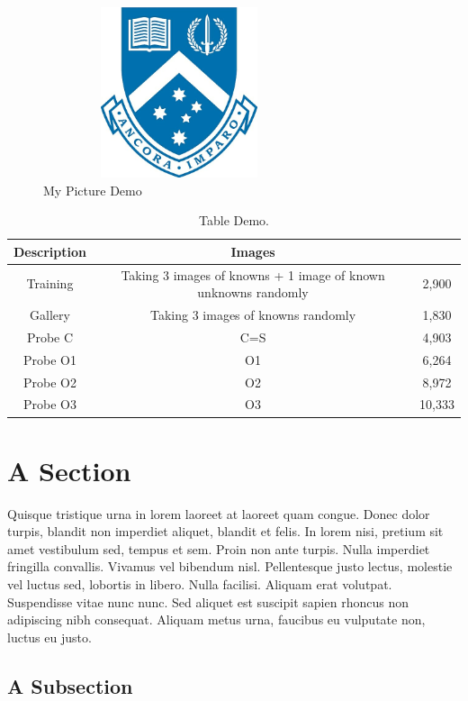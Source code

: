 \begin{figure}
\centering
  \includegraphics[width=8cm,height=5cm]{Figures/crest.jpg}%
  \caption{My Picture Demo\label{fig.demo1}}
\end{figure}

\begin{table}[]
\caption{Table Demo.\label{table.demo1}}
\begin{tabular}{|c|c|c|}
\hline
Description & Images &  \\ \hline
Training & Taking 3 images of knowns + 1 image of known unknowns randomly & 2,900 \\ \hline
Gallery & Taking 3 images of knowns randomly & 1,830 \\ \hline
Probe C & C=S & 4,903 \\ \hline
Probe O1 & O1 & 6,264 \\ \hline
Probe O2 & O2 & 8,972 \\ \hline
Probe O3 & O3 & 10,333 \\ \hline
\end{tabular}
\end{table}

\section{A Section}

Quisque tristique urna in lorem laoreet at laoreet quam congue. Donec dolor turpis, blandit non imperdiet aliquet, blandit et felis. In lorem nisi, pretium sit amet vestibulum sed, tempus et sem. Proin non ante turpis. Nulla imperdiet fringilla convallis. Vivamus vel bibendum nisl. Pellentesque justo lectus, molestie vel luctus sed, lobortis in libero. Nulla facilisi. Aliquam erat volutpat. Suspendisse vitae nunc nunc. Sed aliquet est suscipit sapien rhoncus non adipiscing nibh consequat. Aliquam metus urna, faucibus eu vulputate non, luctus eu justo.

\subsection{A Subsection}

